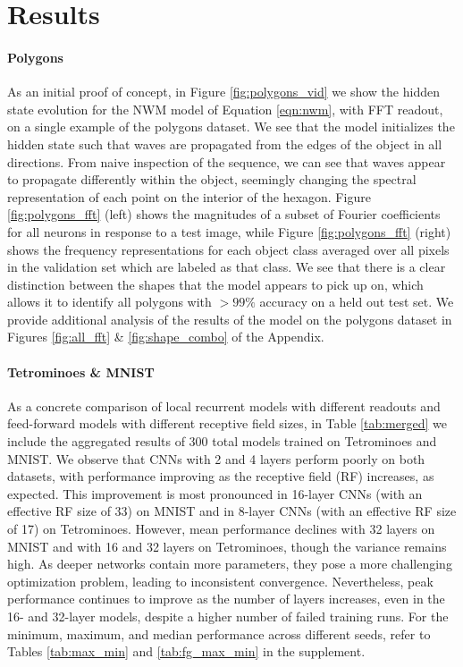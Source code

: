 

\section{Results}

\paragraph{Polygons}
 As an initial proof of concept, in Figure \ref{fig:polygons_vid} we show the hidden state evolution for the NWM model of Equation \ref{eqn:nwm}, with FFT readout, on a single example of the polygons dataset. We see that the model initializes the hidden state such that waves are propagated from the edges of the object in all directions. From naive inspection of the sequence, we can see that waves appear to propagate differently within the object, seemingly changing the spectral representation of each point on the interior of the hexagon. Figure \ref{fig:polygons_fft} (left) shows the magnitudes of a subset of Fourier coefficients for all neurons in response to a test image, while Figure \ref{fig:polygons_fft} (right) shows the frequency representations for each object class averaged over all pixels in the validation set which are labeled as that class. We see that there is a clear distinction between the shapes that the model appears to pick up on, which allows it to identify all polygons with $>99\%$ accuracy on a held out test set. We provide additional analysis of the results of the model on the polygons dataset in Figures \ref{fig:all_fft} \& \ref{fig:shape_combo} of the Appendix.

\vspace{-2mm}
\paragraph{Tetrominoes \& MNIST} As a concrete comparison of local recurrent models with different readouts and feed-forward models with different receptive field sizes, in Table \ref{tab:merged} we include the aggregated results of 300 total models trained on Tetrominoes and MNIST. We observe that CNNs with 2 and 4 layers perform poorly on both datasets, with performance improving as the receptive field (RF) increases, as expected. This improvement is most pronounced in 16-layer CNNs (with an effective RF size of 33) on MNIST and in 8-layer CNNs (with an effective RF size of 17) on Tetrominoes. However, mean performance declines with 32 layers on MNIST and with 16 and 32 layers on Tetrominoes, though the variance remains high. As deeper networks contain more parameters, they pose a more challenging optimization problem, leading to inconsistent convergence. Nevertheless, peak performance continues to improve as the number of layers increases, even in the 16- and 32-layer models, despite a higher number of failed training runs. For the minimum, maximum, and median performance across different seeds, refer to Tables \ref{tab:max_min} and \ref{tab:fg_max_min} in the supplement.


